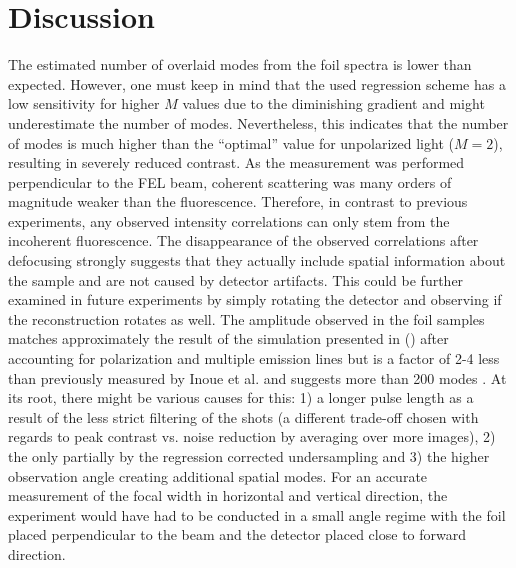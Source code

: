 \section{Discussion}
The estimated number of overlaid modes from the foil spectra is lower than expected. However, one must keep in mind that the used regression scheme has a low sensitivity for higher $M$ values due to the diminishing gradient and might underestimate the number of modes. Nevertheless, this indicates that the number of modes is much higher than the \enquote{optimal} value for unpolarized light ($M=2$), resulting in severely reduced contrast. 
As the measurement was performed perpendicular to the FEL beam, coherent scattering was many orders of magnitude weaker than the fluorescence.  Therefore, in contrast to previous experiments, any observed intensity correlations can only stem from the incoherent fluorescence.
The disappearance of the observed correlations after defocusing strongly suggests that they actually include spatial information about the sample and are not caused by detector artifacts. This could be further examined in future experiments by simply rotating the detector and observing if the reconstruction rotates as well. The amplitude observed in the foil samples matches approximately the result of the simulation presented in   () after accounting for polarization and multiple emission lines but is a factor of 2-4 less than previously measured by Inoue et al. and suggests more than 200 modes \cite{inoue2019}. At its root, there might be various causes for this: 1) a longer pulse length as a result of the less strict filtering of the shots (a different trade-off chosen with regards to peak contrast vs. noise reduction by averaging over more images), 2) the only partially by the regression corrected undersampling and 3) the higher observation angle creating additional spatial modes. For an accurate measurement of the focal width in horizontal and vertical direction, the experiment would have had to be conducted in a small angle regime with the foil placed perpendicular to the beam and the detector placed close to forward direction. 

